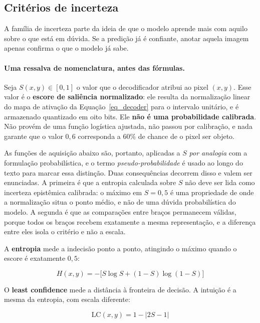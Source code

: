 \subsection{Critérios de incerteza}
\label{sec_crit_incerteza}

A família de incerteza parte da ideia de que o modelo aprende mais com aquilo sobre o que está em dúvida. Se a predição já é confiante, anotar aquela imagem apenas confirma o que o modelo já sabe.

\paragraph{Uma ressalva de nomenclatura, antes das fórmulas.} Seja $S(x,y) \in [0,1]$ o valor que o decodificador atribui ao pixel $(x,y)$. Esse valor é o \textbf{escore de saliência normalizado}: ele resulta da normalização linear do mapa de ativação da Equação~\ref{eq_decoder} para o intervalo unitário, e é armazenado quantizado em oito bits. Ele \textbf{não é uma probabilidade calibrada}. Não provém de uma função logística ajustada, não passou por calibração, e nada garante que o valor $0{,}6$ corresponda a 60\% de chance de o pixel ser objeto.

As funções de aquisição abaixo são, portanto, aplicadas a $S$ \emph{por analogia} com a formulação probabilística, e o termo \emph{pseudo-probabilidade} é usado ao longo do texto para marcar essa distinção. Duas consequências decorrem disso e valem ser enunciadas. A primeira é que a entropia calculada sobre $S$ não deve ser lida como incerteza epistêmica calibrada: o máximo em $S = 0{,}5$ é uma propriedade de onde a normalização situa o ponto médio, e não de uma dúvida probabilística do modelo. A segunda é que as comparações entre braços permanecem válidas, porque todos os braços recebem exatamente a mesma representação, e a diferença entre eles isola o critério e não a escala.

A \textbf{entropia} mede a indecisão ponto a ponto, atingindo o máximo quando o escore é exatamente $0{,}5$:

\begin{equation}
H(x,y) = -\big[S \log S + (1-S)\log(1-S)\big]
\label{eq_entropia}
\end{equation}

O \textbf{least confidence} mede a distância à fronteira de decisão. A intuição é a mesma da entropia, com escala diferente:

\begin{equation}
\text{LC}(x,y) = 1 - |2S - 1|
\label{eq_lc}
\end{equation}

